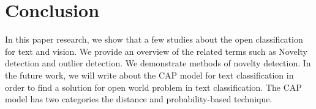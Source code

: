\documentclass[conference]{IEEEtran}
\begin{document}



\section{Conclusion }

In this paper research, we show that a few studies about the open classification for text and vision. We provide an overview of the related terms such as Novelty detection and outlier detection. We demonstrate methods of novelty detection. In the future work, we will write about the CAP model for text classification in order to find a solution for open world problem in text classification. The CAP model has two categories the distance and probability-based technique.  
 
\begin{thebibliography}
\end{thebibliography}


\end{document}
